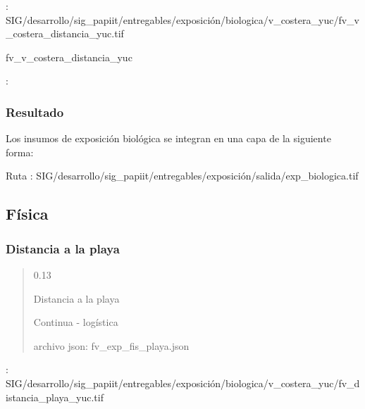 \documentclass[letterpaper,10pt,spanish]{sphinxmanual}
\begin{document}
: SIG/desarrollo/sig\_papiit/entregables/exposición/biologica/v\_costera\_yuc/fv\_v\_costera\_distancia\_yuc.tif

 fv\_v\_costera\_distancia\_yuc

: 


\subsubsection{Resultado}
\label{\detokenize{exposicion:resultado}}
Los insumos de exposición biológica se integran en una capa de la siguiente forma:


Ruta : SIG/desarrollo/sig\_papiit/entregables/exposición/salida/exp\_biologica.tif


\subsection{Física}
\label{\detokenize{exposicion:fisica}}

\subsubsection{Distancia a la playa}
\label{\detokenize{exposicion:distancia-a-la-playa}}
\begin{quote}

 0.13


 Distancia a la playa


 Continua - logística

archivo json: fv\_exp\_fis\_playa.json


\noindent{}
\end{quote}

: SIG/desarrollo/sig\_papiit/entregables/exposición/biologica/v\_costera\_yuc/fv\_distancia\_playa\_yuc.tif
\end{document}
